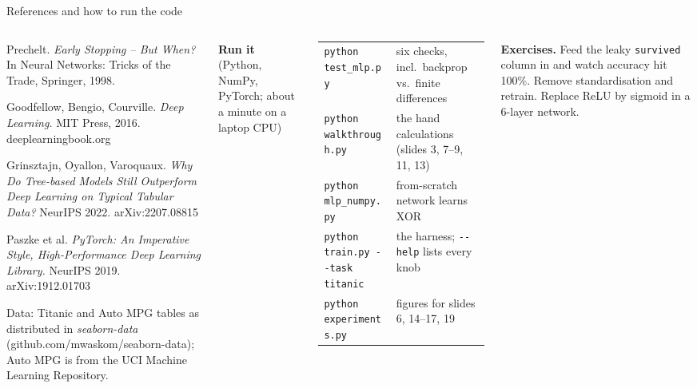 \documentclass[aspectratio=169,10pt]{beamer}
\begin{document}
\begin{frame}{References and how to run the code}
\begin{columns}[T,onlytextwidth]
\begin{enumerate}[{[1]}]
\item Prechelt. \emph{Early Stopping -- But When?} In Neural Networks: Tricks of the Trade, Springer, 1998.
\item Goodfellow, Bengio, Courville. \emph{Deep Learning.} MIT Press, 2016. deeplearningbook.org
\item Grinsztajn, Oyallon, Varoquaux. \emph{Why Do Tree-based Models Still Outperform Deep Learning on Typical Tabular Data?} NeurIPS 2022. arXiv:2207.08815
\item Paszke et al. \emph{PyTorch: An Imperative Style, High-Performance Deep Learning Library.} NeurIPS 2019. arXiv:1912.01703
\item Data: Titanic and Auto MPG tables as distributed in \emph{seaborn-data} (github.com/mwaskom/seaborn-data); Auto MPG is from the UCI Machine Learning Repository.
\end{enumerate}

\vspace{0.5mm}
{\fontsize{6.6}{8.1}\selectfont\color{cInk}
\textbf{Run it} (Python, NumPy, PyTorch; about a minute on a laptop CPU)

\vspace{0.5mm}
\begin{tabular}{@{}l>{\raggedright\arraybackslash}p{40mm}@{}}
\texttt{python test\_mlp.py} & six checks, incl.\ backprop vs.\ finite differences\\
\texttt{python walkthrough.py} & the hand calculations (slides 3, 7--9, 11, 13)\\
\texttt{python mlp\_numpy.py} & from-scratch network learns XOR\\
\texttt{python train.py -{}-task titanic} & the harness; \texttt{-{}-help} lists every knob\\
\texttt{python experiments.py} & figures for slides 6, 14--17, 19\\
\end{tabular}

\vspace{1mm}
\textbf{Exercises.} Feed the leaky \texttt{survived} column in and watch accuracy hit 100\%.
Remove standardisation and retrain. Replace ReLU by sigmoid in a 6-layer network.}
\end{columns}
\end{frame}
\end{document}
